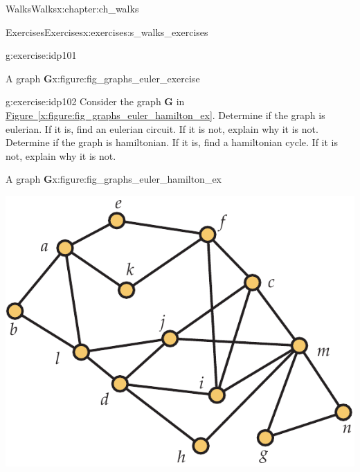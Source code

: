 \documentclass[oneside,10pt,]{book}
\newcommand{\xreffont}{\relax}
\numberwithin{equation}{section}
\newcommand{\bfG}{\mathbf{G}}
\begin{document}
\begin{chapterptx}{Walks}{}{Walks}{}{}{x:chapter:ch_walks}
\begin{exercises-section}{Exercises}{}{Exercises}{}{}{x:exercises:s_walks_exercises}
\begin{divisionexercise}{3}{}{}{g:exercise:idp101}
\begin{figureptx}{A graph \(\bfG\)}{x:figure:fig_graphs_euler_exercise}{}%
\begin{image}{0.125}{0.75}{0.125}%
%
\end{image}%
\tcblower
\end{figureptx}%
\end{divisionexercise}%
\begin{divisionexercise}{4}{}{}{g:exercise:idp102}%
Consider the graph \(\bfG\) in \hyperref[x:figure:fig_graphs_euler_hamilton_ex]{Figure~{\xreffont\ref{x:figure:fig_graphs_euler_hamilton_ex}}}. Determine if the graph is eulerian. If it is, find an eulerian circuit. If it is not, explain why it is not. Determine if the graph is hamiltonian. If it is, find a hamiltonian cycle. If it is not, explain why it is not.%
\begin{figureptx}{A graph \(\bfG\)}{x:figure:fig_graphs_euler_hamilton_ex}{}%
\begin{image}{0.175}{0.65}{0.175}%
\includegraphics[width=\linewidth]{images/euler_hamilton_ex}
\end{image}%
\tcblower
\end{figureptx}%
\end{divisionexercise}%
\end{exercises-section}
\end{chapterptx}
\end{document}
